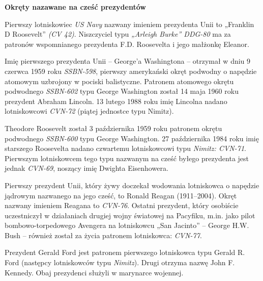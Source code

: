 \newpage

{\Large{\bf Okręty nazawane na cześć prezydentów}\newline}

Pierwszy lotniskowiec \textit{US Navy} nazwany imieniem prezydenta Unii to „Franklin D Roosevelt” \textit{(CV 42)}. Niszczyciel typu \textit{„Arleigh Burke” DDG-80} ma za patronów wspomnianego prezydenta F.D. Roosevelta i jego małżonkę Eleanor.

Imię pierwszego prezydenta Unii – George’a Washingtona – otrzymał w dniu 9 czerwca 1959 roku \textit{SSBN-598}, pierwszy amerykański okręt podwodny o napędzie atomowym uzbrojony w pociski balistyczne. Patronem atomowego okrętu podwodnego \textit{SSBN-602} typu George Washington został 14 maja 1960 roku prezydent Abraham Lincoln. 13 lutego 1988 roku imię Lincolna nadano lotniskowcowi \textit{CVN-72} (piątej jednostce typu Nimitz).

Theodore Roosevelt został 3 października 1959 roku patronem okrętu podwodnego \textit{SSBN-600} typu George Washington. 27 października 1984 roku imię starszego Roosevelta nadano czwartemu lotniskowcowi typu \textit{Nimitz: CVN-71}. Pierwszym lotniskowcem tego typu nazwanym na cześć byłego prezydenta jest jednak \textit{CVN-69}, noszący imię Dwighta Eisenhowera.

Pierwszy prezydent Unii, który żywy doczekał wodowania lotniskowca o napędzie jądrowym nazwanego na jego cześć, to Ronald Reagan (1911–2004). Okręt nazwany imieniem Reagana to \textit{CVN-76}. Ostatni prezydent, który osobiście uczestniczył w działaniach drugiej wojny światowej na Pacyfiku, m.in. jako pilot bombowo-torpedowego Avengera na lotniskowcu „San Jacinto” – George H.W. Bush – również został za życia patronem lotniskowca: \textit{CVN-77}.

Prezydent Gerald Ford jest patronem pierwszego lotniskowca typu Gerald R. Ford (następcy lotniskowców typu \textit{Nimitz}). Drugi otrzyma nazwę John F. Kennedy. Obaj prezydenci służyli w marynarce wojennej.
